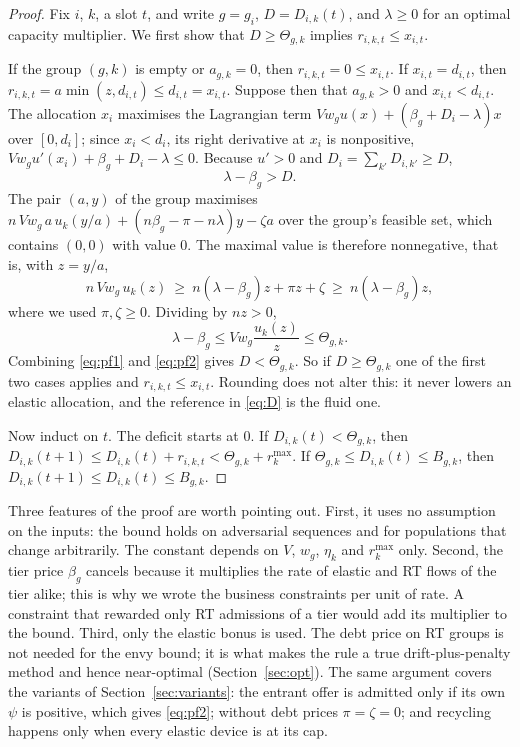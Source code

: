 \documentclass[preprint,11pt]{elsarticle}
\theoremstyle{definition}
\theoremstyle{remark}
\newcommand{\rmax}{r^{\max}}
\begin{document}
\begin{proof}
Fix $i$, $k$, a slot $t$, and write $g=g_i$, $D=D_{i,k}(t)$, and $\lambda\ge0$ for an optimal capacity multiplier.
We first show that $D\ge\Theta_{g,k}$ implies $r_{i,k,t}\le x_{i,t}$.

If the group $(g,k)$ is empty or $a_{g,k}=0$, then $r_{i,k,t}=0\le x_{i,t}$.
If $x_{i,t}=d_{i,t}$, then $r_{i,k,t}=a\min(z,d_{i,t})\le d_{i,t}=x_{i,t}$.
Suppose then that $a_{g,k}>0$ and $x_{i,t}<d_{i,t}$.
The allocation $x_i$ maximises the Lagrangian term $Vw_gu(x)+(\beta_g+D_i-\lambda)x$ over $[0,d_i]$; since $x_i<d_i$, its right derivative at $x_i$ is nonpositive, $Vw_gu'(x_i)+\beta_g+D_i-\lambda\le0$. Because $u'>0$ and $D_i=\sum_{k'}D_{i,k'}\ge D$,
\begin{equation}\label{eq:pf1}
\lambda-\beta_g>D .
\end{equation}
The pair $(a,y)$ of the group maximises $n\,Vw_g\,a\,u_k(y/a)+(n\beta_g-\pi-n\lambda)y-\zeta a$ over the group's feasible set, which contains $(0,0)$ with value $0$. The maximal value is therefore nonnegative, that is, with $z=y/a$,
\[
n\,Vw_g\,u_k(z)\ \ge\ n(\lambda-\beta_g)z+\pi z+\zeta\ \ge\ n(\lambda-\beta_g)z ,
\]
where we used $\pi,\zeta\ge0$. Dividing by $nz>0$,
\begin{equation}\label{eq:pf2}
\lambda-\beta_g\le Vw_g\frac{u_k(z)}{z}\le\Theta_{g,k}.
\end{equation}
Combining \eqref{eq:pf1} and \eqref{eq:pf2} gives $D<\Theta_{g,k}$.
So if $D\ge\Theta_{g,k}$ one of the first two cases applies and $r_{i,k,t}\le x_{i,t}$.
Rounding does not alter this: it never lowers an elastic allocation, and the reference in \eqref{eq:D} is the fluid one.

Now induct on $t$. The deficit starts at $0$. If $D_{i,k}(t)<\Theta_{g,k}$, then $D_{i,k}(t+1)\le D_{i,k}(t)+r_{i,k,t}<\Theta_{g,k}+\rmax_k$. If $\Theta_{g,k}\le D_{i,k}(t)\le B_{g,k}$, then $D_{i,k}(t+1)\le D_{i,k}(t)\le B_{g,k}$.
\end{proof}

Three features of the proof are worth pointing out.
First, it uses no assumption on the inputs: the bound holds on adversarial sequences and for populations that change arbitrarily. The constant depends on $V$, $w_g$, $\eta_k$ and $\rmax_k$ only.
Second, the tier price $\beta_g$ cancels because it multiplies the rate of elastic and RT flows of the tier alike; this is why we wrote the business constraints per unit of rate. A constraint that rewarded only RT admissions of a tier would add its multiplier to the bound.
Third, only the elastic bonus is used. The debt price on RT groups is not needed for the envy bound; it is what makes the rule a true drift-plus-penalty method and hence near-optimal (Section~\ref{sec:opt}).
The same argument covers the variants of Section~\ref{sec:variants}: the entrant offer is admitted only if its own $\psi$ is positive, which gives \eqref{eq:pf2}; without debt prices $\pi=\zeta=0$; and recycling happens only when every elastic device is at its cap.
\end{document}
